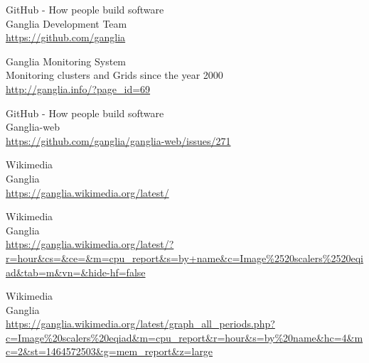 \begin{thebibliography}{10}
GitHub - How people build software\\
Ganglia Development Team\\
  \url{https://github.com/ganglia}

Ganglia Monitoring System\\
Monitoring clusters and Grids since the year 2000\\
  \url{http://ganglia.info/?page_id=69}

GitHub - How people build software\\
Ganglia-web\\
  \url{https://github.com/ganglia/ganglia-web/issues/271}

Wikimedia\\
Ganglia\\
  \url{https://ganglia.wikimedia.org/latest/}

Wikimedia\\
Ganglia\\
  \url{https://ganglia.wikimedia.org/latest/?r=hour&cs=&ce=&m=cpu_report&s=by+name&c=Image\%2520scalers\%2520eqiad&tab=m&vn=&hide-hf=false}

Wikimedia\\
Ganglia\\
  \url{https://ganglia.wikimedia.org/latest/graph_all_periods.php?c=Image\%20scalers\%20eqiad&m=cpu_report&r=hour&s=by\%20name&hc=4&mc=2&st=1464572503&g=mem_report&z=large}


\end{thebibliography}
